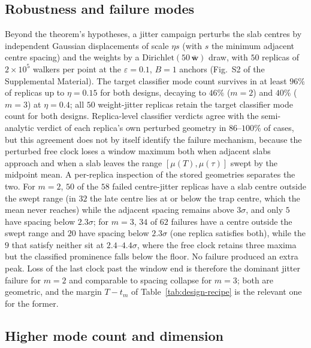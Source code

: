 \documentclass[aps,physrev,reprint,amsmath,amssymb,longbibliography,floatfix]{revtex4-2}
\begin{document}
\subsection{Robustness and failure modes}
\label{sec:numerics-robustness}

Beyond the theorem's hypotheses, a jitter campaign perturbs the slab centres
by independent Gaussian displacements of scale \(\eta s\) (with \(s\) the
minimum adjacent centre spacing) and the weights by a
\(\mathrm{Dirichlet}(50\,\bar{\bm w})\) draw, with \(50\) replicas of
\(2\times10^{5}\) walkers per point at the \(\varepsilon=0.1\), \(B=1\)
anchors (Fig.~S2 of the Supplemental Material).  The target classifier mode count survives in at least \(96\%\) of
replicas up
to \(\eta=0.15\) for both designs, decaying to \(46\%\) (\(m=2\)) and
\(40\%\) (\(m=3\)) at \(\eta=0.4\); all \(50\) weight-jitter replicas
retain the target classifier mode count for both designs.  Replica-level
classifier verdicts agree with the semi-analytic verdict of each replica's
own perturbed geometry in \(86\)--\(100\%\) of cases, but this agreement
does not by itself identify the failure mechanism, because the perturbed
free clock loses a window maximum both when adjacent slabs approach and
when a slab leaves the range \([\mu(T),\mu(\tau)]\) swept by the midpoint
mean.  A per-replica inspection of the stored geometries separates the two.
For \(m=2\), \(50\) of the \(58\) failed centre-jitter replicas have a
slab centre outside the swept range (in \(32\) the late centre lies at or
below the trap centre, which the mean never reaches) while the adjacent
spacing remains above \(3\sigma\), and only \(5\) have spacing below
\(2.3\sigma\); for \(m=3\), \(34\) of \(62\) failures have a centre
outside the swept range and \(20\) have spacing below \(2.3\sigma\) (one
replica satisfies both), while the \(9\) that satisfy neither sit at
\(2.4\)--\(4.4\sigma\), where the free clock retains three maxima but the
classified prominence falls below the floor.
No failure produced an extra peak.  Loss of the last clock past the window
end is therefore the dominant jitter failure for \(m=2\) and comparable to
spacing collapse for \(m=3\); both are geometric, and the margin
\(T-t_m\) of Table~\ref{tab:design-recipe} is the relevant one for the
former.

\subsection{Higher mode count and dimension}
\label{sec:numerics-m5-d3}
\end{document}

